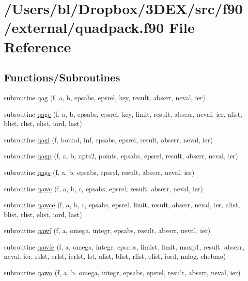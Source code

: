 \hypertarget{quadpack_8f90}{
\section{/Users/bl/Dropbox/3DEX/src/f90/external/quadpack.f90 File Reference}
\label{quadpack_8f90}
}
\subsection*{Functions/Subroutines}
\begin{DoxyCompactItemize}
\item 
subroutine \hyperlink{quadpack_8f90_a44906a25a31588f7e4f41f0e5253193a}{qag} (f, a, b, epsabs, epsrel, key, result, abserr, neval, ier)
\item 
subroutine \hyperlink{quadpack_8f90_ab602437c218a2c74d6a13f9462f98854}{qage} (f, a, b, epsabs, epsrel, key, limit, result, abserr, neval, ier, alist, blist, rlist, elist, iord, last)
\item 
subroutine \hyperlink{quadpack_8f90_ac59eaf7c56c1d421d129425895fa0107}{qagi} (f, bound, inf, epsabs, epsrel, result, abserr, neval, ier)
\item 
subroutine \hyperlink{quadpack_8f90_a99cf2a02a14029fad4762555f04cac0e}{qagp} (f, a, b, npts2, points, epsabs, epsrel, result, abserr, neval, ier)
\item 
subroutine \hyperlink{quadpack_8f90_a00a116a91c0699e57d15abc61dcd531b}{qags} (f, a, b, epsabs, epsrel, result, abserr, neval, ier)
\item 
subroutine \hyperlink{quadpack_8f90_a4cea9ad83248026209e702bb01abb7da}{qawc} (f, a, b, c, epsabs, epsrel, result, abserr, neval, ier)
\item 
subroutine \hyperlink{quadpack_8f90_a51d7f754a9214f7490c035740fc0aef7}{qawce} (f, a, b, c, epsabs, epsrel, limit, result, abserr, neval, ier, alist, blist, rlist, elist, iord, last)
\item 
subroutine \hyperlink{quadpack_8f90_aefd54eff8d0418a0f533f571d80ec5e5}{qawf} (f, a, omega, integr, epsabs, result, abserr, neval, ier)
\item 
subroutine \hyperlink{quadpack_8f90_abe17af7f3ad5cf264791d326bbd15192}{qawfe} (f, a, omega, integr, epsabs, limlst, limit, maxp1, result, abserr, neval, ier, rslst, erlst, ierlst, lst, alist, blist, rlist, elist, iord, nnlog, chebmo)
\item 
subroutine \hyperlink{quadpack_8f90_aaa4f15baf0dadd3383219f0d42a62752}{qawo} (f, a, b, omega, integr, epsabs, epsrel, result, abserr, neval, ier)

\end{DoxyCompactItemize}

